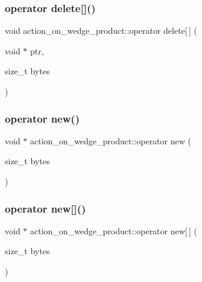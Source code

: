 \subsubsection{\texorpdfstring{operator delete[]()}{operator delete[]()}}
{\footnotesize\ttfamily void action\+\_\+on\+\_\+wedge\+\_\+product\+::operator delete\mbox{[}$\,$\mbox{]} (\begin{DoxyParamCaption}\item[{void $\ast$}]{ptr,  }\item[{size\+\_\+t}]{bytes }\end{DoxyParamCaption})}

\mbox{\label{classaction__on__wedge__product_a2f2c8dc41678ed741cdf12879536070a}} 
\subsubsection{\texorpdfstring{operator new()}{operator new()}}
{\footnotesize\ttfamily void $\ast$ action\+\_\+on\+\_\+wedge\+\_\+product\+::operator new (\begin{DoxyParamCaption}\item[{size\+\_\+t}]{bytes }\end{DoxyParamCaption})}

\mbox{\label{classaction__on__wedge__product_ae7180e94c60af3ccf7bd1067d5323096}} 
\subsubsection{\texorpdfstring{operator new[]()}{operator new[]()}}
{\footnotesize\ttfamily void $\ast$ action\+\_\+on\+\_\+wedge\+\_\+product\+::operator new\mbox{[}$\,$\mbox{]} (\begin{DoxyParamCaption}\item[{size\+\_\+t}]{bytes }\end{DoxyParamCaption})}

